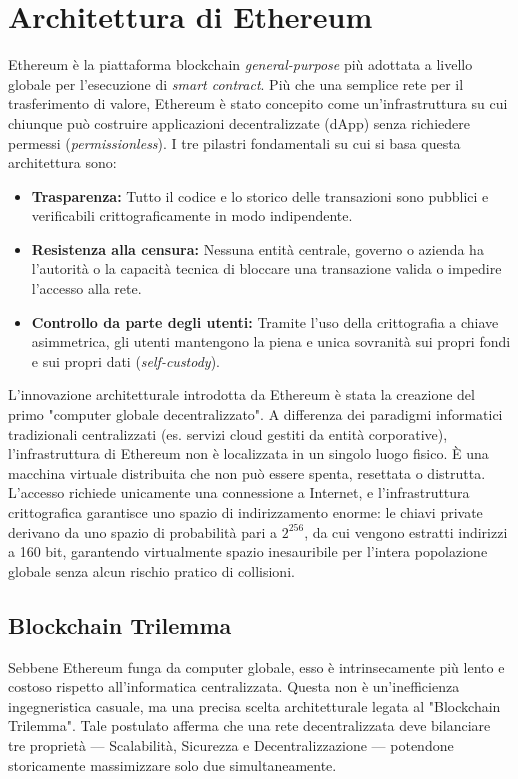 \documentclass[12pt,a4paper,openright,twoside]{report}
\begin{document}
\section{Architettura di Ethereum}

Ethereum è la piattaforma blockchain \textit{general-purpose} più adottata a livello globale per l'esecuzione di \textit{smart contract}. Più che una semplice rete per il trasferimento di valore, Ethereum è stato concepito come un'infrastruttura su cui chiunque può costruire applicazioni decentralizzate (dApp) senza richiedere permessi (\textit{permissionless}). I tre pilastri fondamentali su cui si basa questa architettura sono:
\begin{itemize}
    \item \textbf{Trasparenza:} Tutto il codice e lo storico delle transazioni sono pubblici e verificabili crittograficamente in modo indipendente.
    \item \textbf{Resistenza alla censura:} Nessuna entità centrale, governo o azienda ha l'autorità o la capacità tecnica di bloccare una transazione valida o impedire l'accesso alla rete.
    \item \textbf{Controllo da parte degli utenti:} Tramite l'uso della crittografia a chiave asimmetrica, gli utenti mantengono la piena e unica sovranità sui propri fondi e sui propri dati (\textit{self-custody}).
\end{itemize}
L'innovazione architetturale introdotta da Ethereum è stata la creazione del primo "computer globale decentralizzato". A differenza dei paradigmi informatici tradizionali centralizzati (es. servizi cloud gestiti da entità corporative), l'infrastruttura di Ethereum non è localizzata in un singolo luogo fisico. È una macchina virtuale distribuita che non può essere spenta, resettata o distrutta. L'accesso richiede unicamente una connessione a Internet, e l'infrastruttura crittografica garantisce uno spazio di indirizzamento enorme: le chiavi private derivano da uno spazio di probabilità pari a $2^{256}$, da cui vengono estratti indirizzi a 160 bit, garantendo virtualmente spazio inesauribile per l'intera popolazione globale senza alcun rischio pratico di collisioni.

\subsection{Blockchain Trilemma}
Sebbene Ethereum funga da computer globale, esso è intrinsecamente più lento e costoso rispetto all'informatica centralizzata. Questa non è un'inefficienza ingegneristica casuale, ma una precisa scelta architetturale legata al "Blockchain Trilemma". Tale postulato afferma che una rete decentralizzata deve bilanciare tre proprietà — Scalabilità, Sicurezza e Decentralizzazione — potendone storicamente massimizzare solo due simultaneamente. 
\end{document}
